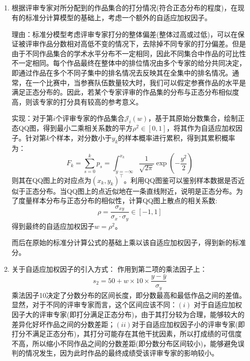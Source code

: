 \documentclass[12pt, onecolumn]{article}
\newcommand\normf{\fangsong}
\begin{document}
	\subsection{\normf{评分模型}}
	\begin{enumerate}
		\item 根据评审专家对所分配到的作品集合的打分情况(符合正态分布的程度)，在现有的标准分计算模型的基础上，考虑一个额外的自适应加权因子。
	
		理由：标准分模型考虑评审专家打分的整体偏差(整体过高或过低)，可以在保证被评审作品分数相对高低不变的情况下，去除掉不同专家的打分偏差。但是由于不同作品集合的学术水平分布不一定相同，因此不同集合中作品的可比性不一定相同。每个作品最终在整体中的排位情况由多个专家的给分共同决定，即通过作品在多个不同子集中的排名情况去反映其在全集中的排名情况。通常，在一个比赛中，当参赛队伍数量较大时，我们可以假定参赛作品的水平是满足正态分布的。因此，若某个专家评审的作品集的分布与正态分布相似度高，则该专家的打分具有较高的参考意义。
		
		实现：对于第$i$个评审专家的作品集合$\mathcal{J}_i(w)$，基于其原始分数集合，绘制正态QQ图，得到最小二乘相关系数的平方$\rho^2\in[0,1]$，将其作为自适应加权因子。针对第$k$个样本，对分数小于$y_k$的样本概率进行累积，得到其累积概率为：
		\begin{equation*}
			F_k=\sum_{s=0}^{k}p_s=\int_{y=-\infty}^{x_k}\frac{1}{\sqrt{2\pi}}\exp\left( -\frac{y^2}{2}\right) 
		\end{equation*}
		则其在QQ图上的对应点为$(x_k,y_k)^\top$。利用QQ图鉴可以鉴别样本数据是否近似于正态分布。当QQ图上的点近似地在一条直线附近，说明是正态分布。为了度量样本分布与正态分布的相似性，计算QQ图上散点的相关系数:
		\begin{equation*}
		\rho=\frac{\sigma_{xy}}{\sigma_x\cdot\sigma_y}\in[-1,1]
		\end{equation*}
		得到最终的自适应加权因子$w=\rho^2$。
		
		而后在原始的标准分计算公式的基础上乘以该自适应加权因子，得到新的标准分。
		
		\item 关于自适应加权因子的引入方式：
		作用到第二项的乘法因子上：
			\begin{equation*}
			s_2=50+w\times10\times\frac{y-\bar{y}}{\sigma_y}
			\end{equation*}
			乘法因子10决定了分数分布的区间长度，即分数最高和最低作品之间的差值。显然，对于不同的评审专家而言，这个区间应该不同：$(i)$ 对于自适应加权因子大的评审专家(即打分满足正态分布)，由于其打分较为合理，能够较大的差异化好坏作品之间的分数差距；$(ii)$对于自适应加权因子小的评审专家(即打分不满足正态分布)，其打分可能存在其他干扰因素，所以打成绩的可信度不高，所以缩小不同作品之间的分数差距(即分数分布区间较小)，能够避免误判的情况发生，因为此时作品的最终成绩受该评审专家的影响较小。
			

\end{enumerate}
\end{document}
